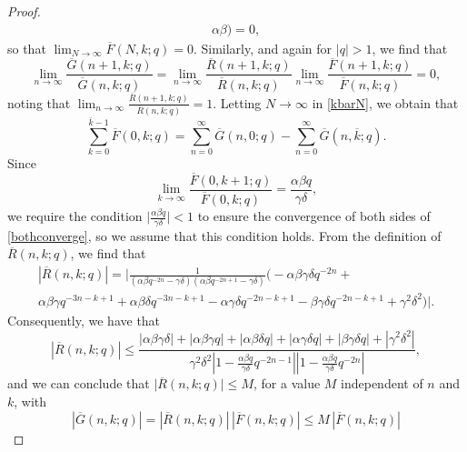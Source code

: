 \documentclass[12pt]{article}
\begin{document}
\begin{proof}
\begin{multline*}
{ \alpha \beta) } = 0, 
\end{multline*} 
 so that $\lim_{N \to \infty} \overline{F}(N,k;q) = 0$. Similarly, and again for $|q| > 1$, we find that 
 $$ \lim_{n \to \infty} \frac{ \overline{G}(n+1,k;q) }{\overline{G}(n,k;q)} 
 = \lim_{n \to \infty} \frac{ \overline{R}(n+1,k;q) }{\overline{R}(n,k;q)} \lim_{n \to \infty} \frac{\overline{F}(n+1,k;q)}{\overline{F}(n,k;q)} = 0, $$
 noting that $ \lim_{n \to \infty} \frac{ \overline{R}(n+1,k;q) }{\overline{R}(n,k;q)} = 1$. 
 Letting $N \to \infty$ in \eqref{kbarN}, we obtain that 
\begin{equation}\label{bothconverge}
 \sum_{k=0}^{\overline{k} - 1} \overline{F}(0, k; q) = \sum_{n=0}^{\infty} \overline{G}(n, 0; q) - \sum_{n = 
  0}^{\infty} \overline{G}(n, \overline{k}; q). 
\end{equation}
 Since $$ \lim_{k \to \infty} \frac{ \overline{F}(0, k+1;q) }{\overline{F}(0, k;q)} = \frac{\alpha \beta q}{\gamma \delta}, $$
 we require the condition $\big| \frac{\alpha \beta q}{\gamma \delta} \big| < 1$
 to ensure the convergence of both sides of \eqref{bothconverge}, so we assume that this condition holds. 
 From the definition of $\overline{R}(n, k;q)$, we find that 
\begin{multline*}
 \left| \overline{R}(n, k; q) \right| = 
 \Bigg| \frac{1}{ \left( \alpha \beta q^{-2n} - \gamma \delta \right) 
 \left( \alpha \beta q^{-2n+1} - \gamma \delta \right)} 
 \big( -\alpha \beta \gamma \delta q^{-2n} + \\ \alpha \beta \gamma q^{-3n - k + 1} 
 + \alpha \beta \delta q^{-3n-k+1} - \alpha \gamma \delta q^{-2n - k + 1} - \beta \gamma \delta q^{-2n-k+1}
 + \gamma^{2} \delta^{2} \big) \Bigg|. 
\end{multline*}
 Consequently, we have that  $$ \left| \overline{R}(n, k; q) \right|   \leq \frac{ |\alpha \beta \gamma \delta| + |\alpha \beta \gamma q|      + 
  |\alpha \beta \delta q| + |\alpha \gamma \delta q| + |\beta \gamma \delta q|     + |\gamma^{2} \delta^{2}| }{ \gamma^{2} \delta^{2}  
  \left| 1 - \frac{\alpha \beta q}{\gamma \delta} q^{-2n-1} \right|    \left| 1 - \frac{\alpha \beta q}{\gamma \delta} q^{-2n} \right| }, $$   and  
    we can conclude that    $ \big| \overline{R}(n, k; q) \big| \leq M$,     for a value $M$ independent of $n$ and $k$,  with 
\begin{equation}\label{boundGwithF}
 \left| \overline{G}(n, k;q) \right| =    \left| \overline{R}(n, k;q) \right| \, \left| \overline{F}(n, k; q) \right|    \leq M \, \left| \overline{F}(n, k;  
  q) \right| 

\end{equation}
\end{proof}
\end{document}
